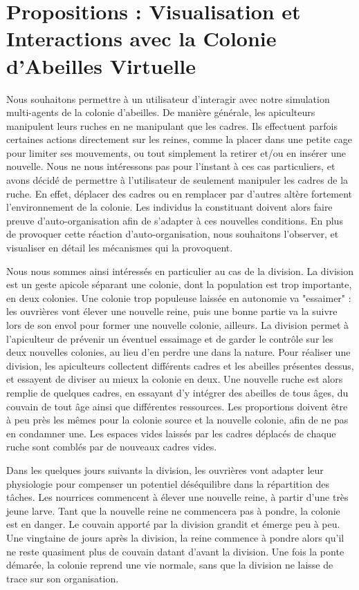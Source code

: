 \chapter{Propositions : Visualisation et Interactions avec la Colonie d'Abeilles Virtuelle}
\label{ChapitrePropVR}

		Nous souhaitons permettre à un utilisateur d'interagir avec notre simulation multi-agents de la colonie d'abeilles. De manière générale, les apiculteurs manipulent leurs ruches en ne manipulant que les cadres. Ils effectuent parfois certaines actions directement sur les reines, comme la placer dans une petite cage pour limiter ses mouvements, ou tout simplement la retirer et/ou en insérer une nouvelle. Nous ne nous intéressons pas pour l'instant à ces cas particuliers, et avons décidé de permettre à l'utilisateur de seulement manipuler les cadres de la ruche. En effet, déplacer des cadres ou en remplacer par d'autres altère fortement l'environnement de la colonie. Les individus la constituant doivent alors faire preuve d'auto-organisation afin de s'adapter à ces nouvelles conditions. En plus de provoquer cette réaction d'auto-organisation, nous souhaitons l'observer, et visualiser en détail les mécanismes qui la provoquent.
		
		Nous nous sommes ainsi intéressés en particulier au cas de la division. La division est un geste apicole séparant une colonie, dont la population est trop importante, en deux colonies. Une colonie trop populeuse laissée en autonomie va "essaimer" : les ouvrières vont élever une nouvelle reine, puis une bonne partie va la suivre lors de son envol pour former une nouvelle colonie, ailleurs. La division permet à l'apiculteur de prévenir un éventuel essaimage et de garder le contrôle sur les deux nouvelles colonies, au lieu d'en perdre une dans la nature. Pour réaliser une division, les apiculteurs collectent différents cadres et les abeilles présentes dessus, et essayent de diviser au mieux la colonie en deux. Une nouvelle ruche est alors remplie de quelques cadres, en essayant d'y intégrer des abeilles de tous âges, du couvain de tout âge ainsi que différentes ressources. Les proportions doivent être à peu près les mêmes pour la colonie source et la nouvelle colonie, afin de ne pas en condamner une. Les espaces vides laissés par les cadres déplacés de chaque ruche sont comblés par de nouveaux cadres vides.
		
		Dans les quelques jours suivants la division, les ouvrières vont adapter leur physiologie pour compenser un potentiel déséquilibre dans la répartition des tâches. Les nourrices commencent à élever une nouvelle reine, à partir d'une très jeune larve. Tant que la nouvelle reine ne commencera pas à pondre, la colonie est en danger. Le couvain apporté par la division grandit et émerge peu à peu. Une vingtaine de jours après la division, la reine commence à pondre alors qu'il ne reste quasiment plus de couvain datant d'avant la division. Une fois la ponte démarée, la colonie reprend une vie normale, sans que la division ne laisse de trace sur son organisation.
		
